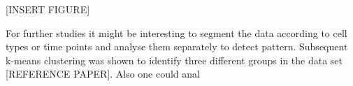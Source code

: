 

[INSERT FIGURE]

For further studies it might be interesting to segment the data according to cell types or time points and analyse them separately to detect pattern. Subsequent k-means clustering was shown to identify three different groups in the data set [REFERENCE PAPER].
Also one could anal



